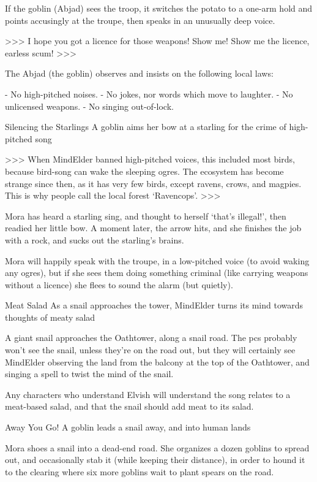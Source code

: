 If the goblin (Abjad) sees the troop, it switches the potato to a one-arm hold and points accusingly at the troupe, then speaks in an unusually deep voice.

>>>
I hope you got a licence for those weapons!
Show me!
Show me the licence, earless scum!
>>>

The Abjad (the goblin) observes and insists on the following local laws:

- No high-pitched noises.
- No jokes, nor words which move to laughter.
- No unlicensed weapons.
- No singing out-of-lock.



{Silencing the Starlings}%
{A goblin aims her bow at a starling for the crime of high-pitched song}%

>>>
When \gls{MindElder} banned high-pitched voices, this included most birds, because bird-song can wake the sleeping ogres.
The ecosystem has become strange since then, as it has very few birds, except ravens, crows, and magpies.
This is why people call the local forest `Ravencops'.
>>>

Mora has heard a starling sing, and thought to herself `that's illegal!', then readied her little bow.
A moment later, the arrow hits, and she finishes the job with a rock, and sucks out the starling's brains.

Mora will happily speak with the troupe, in a low-pitched voice (to avoid waking any ogres), but if she sees them doing something criminal (like carrying weapons without a licence) she flees to sound the alarm (but quietly).


{Meat Salad}%
{As a snail approaches the tower, \gls{MindElder} turns its mind towards thoughts of meaty salad}%

A giant snail approaches the Oathtower, along a snail road.
The \glspl{pc} probably won't see the snail, unless they're on the road out, but they will certainly see \gls{MindElder} observing the land from the balcony at the top of the Oathtower, and singing a spell to twist the mind of the snail.

Any characters who understand Elvish
will understand the song relates to a meat-based salad, and that the snail should add meat to its salad.


{Away You Go!}%
{A goblin leads a snail away, and into human lands}%

Mora shoes a snail into a dead-end road.
She organizes a dozen goblins to spread out, and occasionally stab it (while keeping their distance), in order to hound it to the clearing where  six more goblins wait to plant spears on the road.

